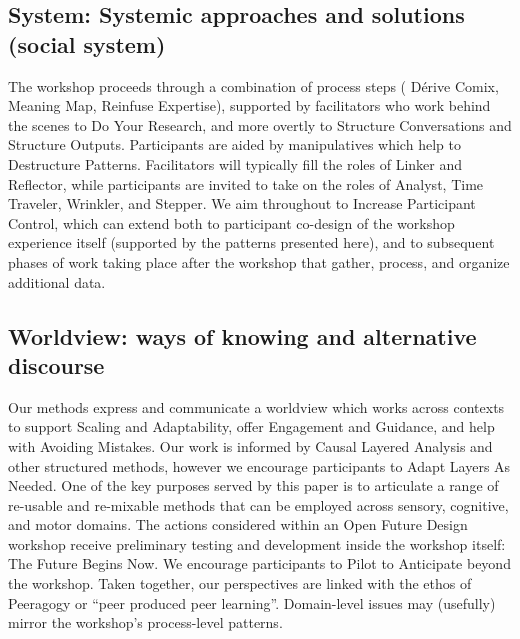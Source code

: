 \documentclass[acmlarge,timestamp]{acmart}
\begin{document}
\subsection{System: Systemic approaches and solutions (social system)}
The workshop proceeds through a combination of process steps ({\sc
  D\'erive Comix}, {\sc Meaning Map}, {\sc Reinfuse Expertise}),
supported by facilitators who work behind the scenes to {\sc Do Your
  Research}, and more overtly to {\sc Structure Conversations} and
{\sc Structure Outputs}.  Participants are aided by manipulatives
which help to {\sc Destructure Patterns}.  Facilitators will typically
fill the roles of {\sc Linker} and {\sc Reflector}, while participants
are invited to take on the roles of {\sc Analyst}, {\sc Time
  Traveler}, {\sc Wrinkler}, and {\sc Stepper}.  We aim throughout to
{\sc Increase Participant Control}, which can extend both to
participant co-design of the workshop experience itself (supported by
the patterns presented here), and to subsequent phases of work taking
place after the workshop that gather, process, and organize additional
data.

\subsection{Worldview: ways of knowing and alternative discourse}
Our methods express and communicate a worldview which works across
contexts to support {\sc Scaling and Adaptability}, offer {\sc
  Engagement and Guidance}, and help with {\sc Avoiding Mistakes}.
Our work is informed by Causal Layered Analysis and other structured
methods, however we encourage participants to {\sc Adapt Layers As
  Needed}.  One of the key purposes served by this paper is to
articulate a range of re-usable and re-mixable methods that can be
employed across sensory, cognitive, and motor domains.  The actions
considered within an Open Future Design workshop receive preliminary
testing and development inside the workshop itself: {\sc The Future
  Begins Now}. We encourage participants to {\sc Pilot to Anticipate}
beyond the workshop.  Taken together, our perspectives are linked with
the ethos of Peeragogy or “peer produced peer learning”.  Domain-level
issues may (usefully) mirror the workshop’s process-level patterns.
\end{document}
